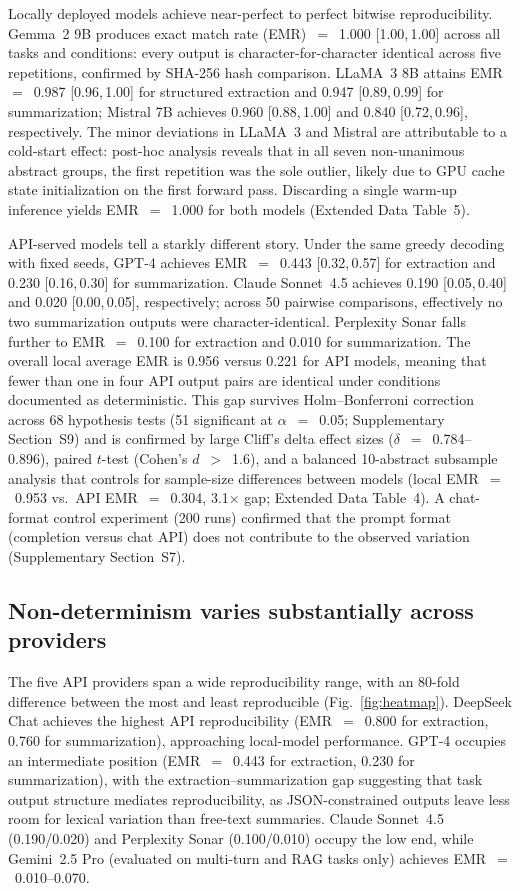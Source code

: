 \documentclass[sn-nature]{sn-jnl}
\begin{document}
Locally deployed models achieve near-perfect to perfect bitwise reproducibility.
Gemma~2 9B produces exact match rate (EMR)~$=$~1.000 [1.00,\,1.00] across all tasks and conditions: every output is character-for-character identical across five repetitions, confirmed by SHA-256 hash comparison.
LLaMA~3 8B attains EMR~$=$~0.987 [0.96,\,1.00] for structured extraction and 0.947 [0.89,\,0.99] for summarization; Mistral 7B achieves 0.960 [0.88,\,1.00] and 0.840 [0.72,\,0.96], respectively.
The minor deviations in LLaMA~3 and Mistral are attributable to a cold-start effect: post-hoc analysis reveals that in all seven non-unanimous abstract groups, the first repetition was the sole outlier, likely due to GPU cache state initialization on the first forward pass.
Discarding a single warm-up inference yields EMR~$=$~1.000 for both models (Extended Data Table~5).

API-served models tell a starkly different story.
Under the same greedy decoding with fixed seeds, GPT-4 achieves EMR~$=$~0.443 [0.32,\,0.57] for extraction and 0.230 [0.16,\,0.30] for summarization.
Claude Sonnet~4.5 achieves 0.190 [0.05,\,0.40] and 0.020 [0.00,\,0.05], respectively; across 50 pairwise comparisons, effectively no two summarization outputs were character-identical.
Perplexity Sonar falls further to EMR~$=$~0.100 for extraction and 0.010 for summarization.
The overall local average EMR is 0.956 versus 0.221 for API models, meaning that fewer than one in four API output pairs are identical under conditions documented as deterministic.
This gap survives Holm--Bonferroni correction across 68 hypothesis tests (51 significant at $\alpha$~$=$~0.05; Supplementary Section~S9) and is confirmed by large Cliff's delta effect sizes ($\delta$~$=$~0.784--0.896), paired $t$-test (Cohen's $d$~$>$~1.6), and a balanced 10-abstract subsample analysis that controls for sample-size differences between models (local EMR~$=$~0.953 vs.\ API EMR~$=$~0.304, 3.1$\times$ gap; Extended Data Table~4).
A chat-format control experiment (200 runs) confirmed that the prompt format (completion versus chat API) does not contribute to the observed variation (Supplementary Section~S7).


\subsection{Non-determinism varies substantially across providers}\label{subsec:providers}

The five API providers span a wide reproducibility range, with an 80-fold difference between the most and least reproducible (Fig.~\ref{fig:heatmap}).
DeepSeek Chat achieves the highest API reproducibility (EMR~$=$~0.800 for extraction, 0.760 for summarization), approaching local-model performance.
GPT-4 occupies an intermediate position (EMR~$=$~0.443 for extraction, 0.230 for summarization), with the extraction--summarization gap suggesting that task output structure mediates reproducibility, as JSON-constrained outputs leave less room for lexical variation than free-text summaries.
Claude Sonnet~4.5 (0.190/0.020) and Perplexity Sonar (0.100/0.010) occupy the low end, while Gemini~2.5 Pro (evaluated on multi-turn and RAG tasks only) achieves EMR~$=$~0.010--0.070.
\end{document}
